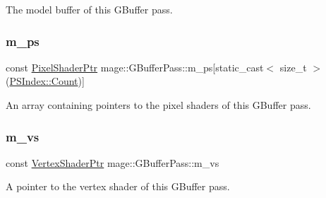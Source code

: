 The model buffer of this G\+Buffer pass. \hypertarget{classmage_1_1_g_buffer_pass_a0a94aa51d00b6b057bb9b10f1a2f8eff}{}\label{classmage_1_1_g_buffer_pass_a0a94aa51d00b6b057bb9b10f1a2f8eff} 
\subsubsection{\texorpdfstring{m\+\_\+ps}{m\_ps}}
{\footnotesize\ttfamily const \hyperlink{namespacemage_acbec875bb5e5e085e32ed244a24d2b6f}{Pixel\+Shader\+Ptr} mage\+::\+G\+Buffer\+Pass\+::m\+\_\+ps\mbox{[}static\+\_\+cast$<$ size\+\_\+t $>$(\hyperlink{classmage_1_1_g_buffer_pass_a23039b6695c10c88676c38fe63123571ae93f994f01c537c4e2f7d8528c3eb5e9}{P\+S\+Index\+::\+Count})\mbox{]}\hspace{0.3cm}{\ttfamily [private]}}

An array containing pointers to the pixel shaders of this G\+Buffer pass. \hypertarget{classmage_1_1_g_buffer_pass_af0a641e0246f6d90b5ff3c010fad7bd0}{}\label{classmage_1_1_g_buffer_pass_af0a641e0246f6d90b5ff3c010fad7bd0} 
\subsubsection{\texorpdfstring{m\+\_\+vs}{m\_vs}}
{\footnotesize\ttfamily const \hyperlink{namespacemage_a1f19b094f771e30bc0a6c1cebcc0dd58}{Vertex\+Shader\+Ptr} mage\+::\+G\+Buffer\+Pass\+::m\+\_\+vs\hspace{0.3cm}{\ttfamily [private]}}

A pointer to the vertex shader of this G\+Buffer pass. 
